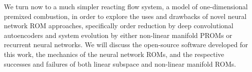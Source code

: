 
We turn now to a much simpler reacting flow system, a model of one-dimensional premixed combustion, in order to explore the uses and drawbacks of novel neural network ROM approaches, specifically order reduction by deep convolutional autoencoders and system evolution by either non-linear manifold PROMs or recurrent neural networks. We will discuss the open-source software developed for this work, the mechanics of the neural network ROMs, and the respective successes and failures of both linear subspace and non-linear manifold ROMs.